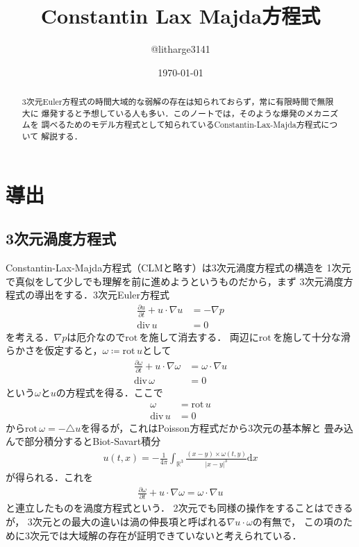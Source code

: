 \documentclass[dvipdfmx,autodetect-engine]{jsarticle}
\theoremstyle{remark}
\theoremstyle{definition}
\newcommand{\R}{\mathbb{R}}
\newcommand{\diver}{\mathrm{div} \,}
\newcommand{\rot}{\mathrm{rot} \,}
\begin{document}
\title{Constantin Lax Majda方程式}
\author{@litharge3141}
\date{\today}
\maketitle

\begin{abstract}
    3次元Euler方程式の時間大域的な弱解の存在は知られておらず，常に有限時間で無限大に
    爆発すると予想している人も多い．このノートでは，そのような爆発のメカニズムを
    調べるためのモデル方程式として知られているConstantin-Lax-Majda方程式について
    解説する．
\end{abstract}

\section{導出}
\subsection{3次元渦度方程式}
Constantin-Lax-Majda方程式（CLMと略す）は3次元渦度方程式の構造を
1次元で真似をして少しでも理解を前に進めようというものだから，まず
3次元渦度方程式の導出をする．3次元Euler方程式
\begin{align*}
   \frac{\partial u}{\partial t} + u \cdot \nabla u &= - \nabla p \\
   \diver u &=0
\end{align*}
を考える．$\nabla p$は厄介なので$\rot$を施して消去する．
両辺に$\rot$を施して十分な滑らかさを仮定すると，$\omega \coloneqq \rot u$として
\begin{align*}
    \frac{\partial \omega}{\partial t} + u \cdot \nabla \omega &= \omega \cdot \nabla u \\
    \diver\omega &=0
\end{align*}
という$\omega$と$u$の方程式を得る．ここで
\begin{align*}
    \omega &= \rot u \\
    \diver u &= 0
\end{align*}
から$\rot \omega = - \triangle u$を得るが，これはPoisson方程式だから3次元の基本解と
畳み込んで部分積分するとBiot-Savart積分
\begin{align*}
    u(t,x) = -\frac{1}{4\pi} \int_{\R^3} \frac{(x-y)\times \omega(t,y)}{{\lvert x-y \rvert}^3} \mathrm{d}x
\end{align*}
が得られる．これを
\begin{align*}
    \frac{\partial \omega}{\partial t} + u \cdot \nabla \omega = \omega \cdot \nabla u 
\end{align*}
と連立したものを渦度方程式という．
2次元でも同様の操作をすることはできるが，
3次元との最大の違いは渦の伸長項と呼ばれる$\nabla u \cdot \omega$の有無で，
この項のために3次元では大域解の存在が証明できていないと考えられている．
\end{document}
